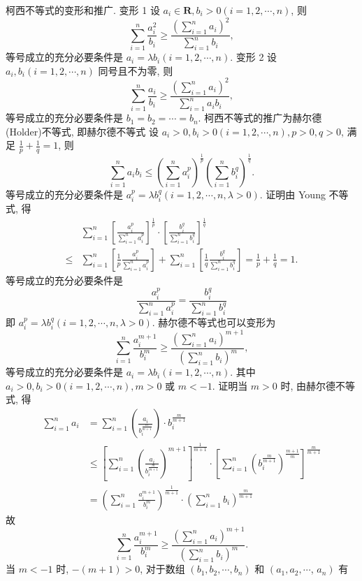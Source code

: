 柯西不等式的变形和推广.
变形 1 设 $a_i \in \mathbf{R}, b_i>0(i=1,2, \cdots, n)$, 则
$$
\sum_{i=1}^n \frac{a_i^2}{b_i} \geqslant \frac{\left(\sum_{i=1}^n a_i\right)^2}{\sum_{i=1}^n b_i},
$$
等号成立的充分必要条件是 $a_i=\lambda b_i(i=1,2, \cdots, n)$.
变形 2 设 $a_i, b_i(i=1,2, \cdots, n)$ 同号且不为零, 则
$$
\sum_{i=1}^n \frac{a_i}{b_i} \geqslant \frac{\left(\sum_{i=1}^n a_i\right)^2}{\sum_{i=1}^n a_i b_i},
$$
等号成立的充分必要条件是 $b_1=b_2=\cdots=b_n$.
柯西不等式的推广为赫尔德 (Holder)不等式, 即赫尔德不等式 设 $a_i>0, b_i>0(i=1,2, \cdots, n), p>0, q>0$, 满足 $\frac{1}{p}+\frac{1}{q}=1$, 则
$$
\sum_{i=1}^n a_i b_i \leqslant\left(\sum_{i=1}^n a_i^p\right)^{\frac{1}{p}}\left(\sum_{i=1}^n b_i^q\right)^{\frac{1}{q}} .
$$
等号成立的充分必要条件是 $a_i^p=\lambda b_i^q(i=1,2, \cdots, n, \lambda>0)$.
证明由 Young 不等式, 得
$$
\begin{aligned}
& \sum_{i=1}^n\left[\frac{a_i^p}{\sum_{i=1}^n a_i^p}\right]^{\frac{1}{p}} \cdot\left[\frac{b_i^q}{\sum_{i=1}^n b_i^q}\right]^{\frac{1}{q}} \\
\leqslant & \sum_{i=1}^n\left[\frac{1}{p} \frac{a_i^p}{\sum_{i=1}^n a_i^p}\right]+\sum_{i=1}^n\left[\frac{1}{q} \frac{b_i^q}{\sum_{i=1}^n b_i^q}\right]=\frac{1}{p}+\frac{1}{q}=1 .
\end{aligned}
$$
等号成立的充分必要条件是
$$
\frac{a_i^p}{\sum_{i=1}^n a_i^p}=\frac{b_i^q}{\sum_{i=1}^n b_i^q}
$$
即 $a_i^p=\lambda b_i^q(i=1,2, \cdots, n, \lambda>0)$.
赫尔德不等式也可以变形为
$$
\sum_{i=1}^n \frac{a_i^{m+1}}{b_i^m} \geqslant \frac{\left(\sum_{i=1}^n a_i\right)^{m+1}}{\left(\sum_{i=1}^n b_i\right)^m},
$$
等号成立的充分必要条件是 $a_i=\lambda b_i(i=1,2, \cdots, n)$. 其中 $a_i>0, b_i>0 (i=1,2, \cdots, n), m>0$ 或 $m<-1$.
证明当 $m>0$ 时, 由赫尔德不等式, 得
$$
\begin{aligned}
\sum_{i=1}^n a_i & =\sum_{i=1}^n\left(\frac{a_i}{b_i^{\frac{m}{m+1}}}\right) \cdot b_i^{\frac{m}{m+1}} \\
& \leqslant\left[\sum_{i=1}^n\left(\frac{a_i}{b_i^{\frac{m}{m+1}}}\right)^{m+1}\right]^{\frac{1}{m+1}} \cdot\left[\sum_{i=1}^n\left(b_i^{\frac{m}{m+1}}\right)^{\frac{m+1}{m}}\right]^{\frac{m}{m+1}} \\
& =\left(\sum_{i=1}^n \frac{a_i^{m+1}}{b_i^m}\right)^{\frac{1}{m+1}} \cdot\left(\sum_{i=1}^n b_i\right)^{\frac{m}{m+1}}
\end{aligned}
$$
故
$$
\sum_{i=1}^n \frac{a_i^{m+1}}{b_i^m} \geqslant \frac{\left(\sum_{i=1}^n a_i\right)^{m+1}}{\left(\sum_{i=1}^n b_i\right)^m} .
$$
当 $m<-1$ 时, $-(m+1)>0$, 对于数组 $\left(b_1, b_2, \cdots, b_n\right)$ 和 $\left(a_1, a_2, \cdots\right.$, $\left.a_n\right)$ 有
